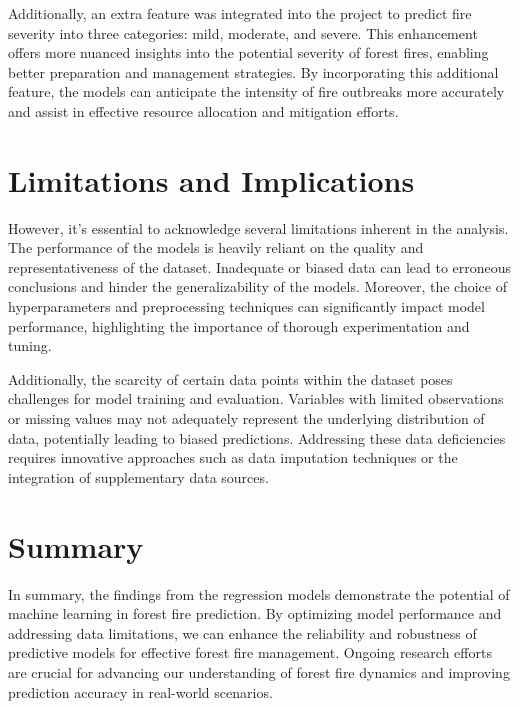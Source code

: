 Additionally, an extra feature was integrated into the project to predict fire severity into three categories: mild, moderate, and severe. This enhancement offers more nuanced insights into the potential severity of forest fires, enabling better preparation and management strategies. By incorporating this additional feature, the models can anticipate the intensity of fire outbreaks more accurately and assist in effective resource allocation and mitigation efforts.

\section{Limitations and Implications}

However, it's essential to acknowledge several limitations inherent in the analysis. The performance of the models is heavily reliant on the quality and representativeness of the dataset. Inadequate or biased data can lead to erroneous conclusions and hinder the generalizability of the models. Moreover, the choice of hyperparameters and preprocessing techniques can significantly impact model performance, highlighting the importance of thorough experimentation and tuning.

Additionally, the scarcity of certain data points within the dataset poses challenges for model training and evaluation. Variables with limited observations or missing values may not adequately represent the underlying distribution of data, potentially leading to biased predictions. Addressing these data deficiencies requires innovative approaches such as data imputation techniques or the integration of supplementary data sources.


\section{Summary}

In summary, the findings from the regression models demonstrate the potential of machine learning in forest fire prediction. By optimizing model performance and addressing data limitations, we can enhance the reliability and robustness of predictive models for effective forest fire management. Ongoing research efforts are crucial for advancing our understanding of forest fire dynamics and improving prediction accuracy in real-world scenarios.
